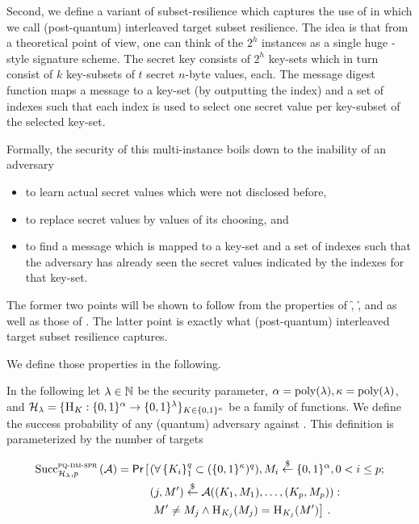 Second, we define a variant of subset-resilience which captures the use 
of \fors in \spx which we call (post-quantum)  interleaved target subset resilience.
The idea is that from a theoretical point of view, one can think of the 
$2^h$ \fors instances as a single huge \hors-style signature scheme.
The secret key consists of $2^h$ key-sets which in turn consist of $k$ 
key-subsets of $t$ secret $n$-byte values, each. The message digest function 
\sphincsHmsg maps a message to a key-set (by outputting the index) and a set 
of indexes such that each index is used to select one secret value per 
key-subset of the selected key-set. 

Formally, the security of this multi-instance \fors boils down to the inability 
of an adversary 
\begin{itemize}
\item to learn actual secret values which were not disclosed before, 
\item to replace secret values by values of its choosing, and 
\item to find a message which is mapped to a key-set and a set of indexes such that 
the adversary has already seen the secret values indicated by the indexes for 
that key-set.
\end{itemize}
The former two points will be shown to follow from the properties of \f, \h, and 
\tfunc as well as those of \sphincsPRF. The latter point is exactly what
(post-quantum) interleaved target subset resilience captures.

We define those properties in the following.

\newline
In the following
let $\lambda\in\NN$ be the security parameter, $\alpha=\poly(\lambda),\kappa =\poly(\lambda)$, and
$\hf_\lambda = \{\h_K: \bin^{\alpha} \rightarrow \bin^\lambda\}_{K \in \bin^\kappa}$ be a
family of functions. 
We define the success probability of any (quantum) adversary \A against \pqmmspr. 
This definition is parameterized by the number of targets 

\begin{align} \label{eqn_pqdmspr}
\succf{\pqdmspr}{\hf_\lambda, p}{\A} = \pr\left[\right. 
  & (\forall \vecify{1}{q}{K_i} \subset (\bin^\kappa)^q), M_i \rand \bin^{\alpha}, 0 < i \leq p;\nonumber\\
 & (j,M') \rand \A((K_1,M_1), \ldots, (K_p,M_p)):\nonumber\\
 &\left.M'\neq M_j \wedge \h_{K_j}(M_j) = \h_{K_j}(M') \right]\,.
\end{align}

